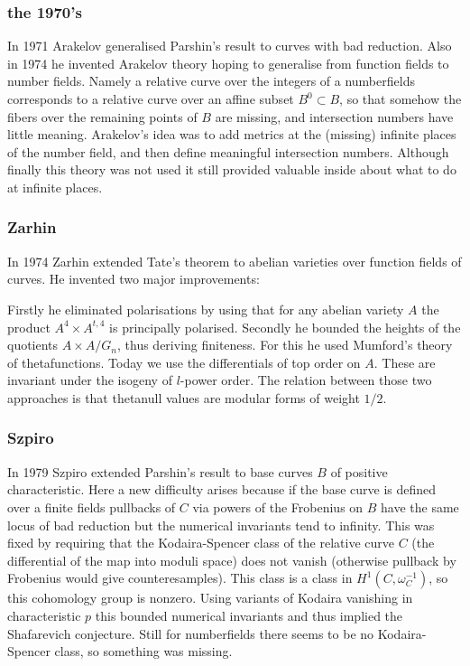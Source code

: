 \documentclass{beamer}
\begin{document}
\begin{frame}
\frametitle{the 1970's}
In 1971 Arakelov generalised Parshin's result to curves with bad reduction. Also in 1974 he invented Arakelov theory hoping to generalise from function fields to number fields. Namely a relative curve over the integers of a numberfields corresponds to a relative curve over an affine subset $B^0 \subset B$, so that somehow the fibers over the remaining points of $B$ are missing, and intersection numbers have little meaning. Arakelov's idea was to add metrics at the (missing) infinite places of the number field, and then define meaningful intersection numbers. Although finally this theory was not used it still provided valuable inside about what to do at infinite places.
\end{frame}
\begin{frame}
\frametitle{Zarhin}
In 1974 Zarhin extended Tate's theorem to abelian varieties over function fields of curves. He invented two major improvements:

Firstly he eliminated polarisations by using that for any abelian variety $A$ the product $A^4 \times A^{t,4}$ is principally polarised. Secondly he bounded the heights of the quotients $A \times A/G_n$, thus deriving finiteness. For this he used Mumford's theory of thetafunctions. Today we use the differentials of top order on $A$. These are invariant under the isogeny of $l$-power order. The relation between those two approaches is that thetanull values are modular forms of weight $1/2$.

\end{frame}
\begin{frame}
\frametitle{Szpiro}
In 1979 Szpiro extended Parshin's result to base  curves $B$ of positive characteristic. Here a new difficulty arises because if the base curve is defined over a finite fields pullbacks of $C$ via powers of the Frobenius on $B$ have the same locus of bad reduction but the numerical invariants tend to infinity. This was fixed by requiring that the Kodaira-Spencer class of the relative curve $C$ (the differential of the map into moduli space) does not vanish (otherwise pullback by Frobenius would give counteresamples). This class is a class in $H^1(C, \omega_C^{-1})$, so this cohomology group is nonzero. Using variants of Kodaira vanishing in characteristic $p$ this bounded numerical invariants and thus implied the Shafarevich conjecture. Still for numberfields there seems to be no Kodaira-Spencer class, so something was missing.
\end{frame}
\end{document}

